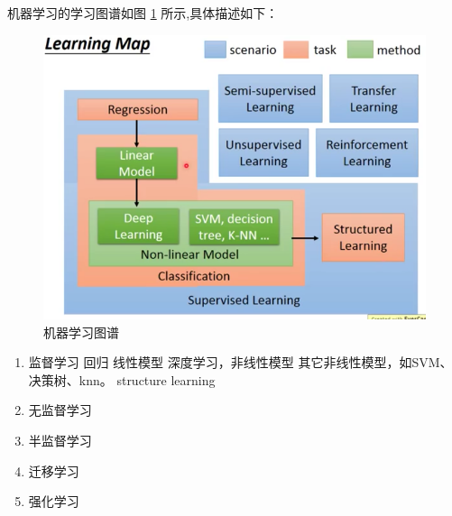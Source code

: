 \documentclass[UTF8]{ctexbook}
\begin{document}
机器学习的学习图谱如图 \ref{fig:ml_map} 所示,具体描述如下：

\begin{figure}[ht]
	\centering
	\includegraphics[scale=0.4]{./pic/learning_map.png}
	\caption{机器学习图谱}
	\label{fig:ml_map}
\end{figure}
	
\begin{enumerate}
	\item 监督学习
		\subitem 回归
		\subitem 线性模型
		\subitem 深度学习，非线性模型
		\subitem 其它非线性模型，如SVM、决策树、knn。
		\subitem structure learning
	\item 无监督学习
	\item 半监督学习
	\item 迁移学习
	\item 强化学习

\end{enumerate}
\end{document}
